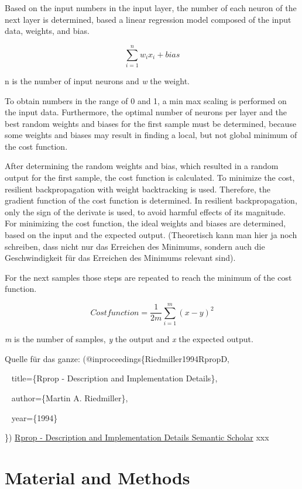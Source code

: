 \documentclass[
  parskip,
  oneside]{scrreprt}
\begin{document}
Based on the input numbers in the input layer, the number of each neuron
of the next layer is determined, based a linear regression model
composed of the input data, weights, and bias.

\[
\sum_{i=1} ^{n} w_i x_i + bias
\]

n is the number of input neurons and \emph{w} the weight.

To obtain numbers in the range of 0 and 1, a min max scaling is
performed on the input data. Furthermore, the optimal number of neurons
per layer and the best random weights and biases for the first sample
must be determined, because some weights and biases may result in
finding a local, but not global minimum of the cost function.

After determining the random weights and bias, which resulted in a
random output for the first sample, the cost function is calculated. To
minimize the cost, resilient backpropagation with weight backtracking is
used. Therefore, the gradient function of the cost function is
determined. In resilient backpropagation, only the sign of the derivate
is used, to avoid harmful effects of its magnitude. For minimizing the
cost function, the ideal weights and biases are determined, based on the
input and the expected output. (Theoretisch kann man hier ja noch
schreiben, dass nicht nur das Erreichen des Minimums, sondern auch die
Geschwindigkeit für das Erreichen des Minimums relevant sind).

For the next samples those steps are repeated to reach the minimum of
the cost function.

\[
Cost function = \frac {1}{2m} \sum_{i=1} ^{m} (x - y)^2
\]

\emph{m} is the number of samples, \emph{y} the output and \emph{x} the
expected output.

Quelle für das ganze: (@inproceedings\{Riedmiller1994RpropD,

~ title=\{Rprop - Description and Implementation Details\},

~ author=\{Martin A. Riedmiller\},

~ year=\{1994\}

\})
\href{https://www.semanticscholar.org/paper/Rprop-Description-and-Implementation-Details-Riedmiller/a8815421205d3a8938d78db974db1d4f3584ffb6}{Rprop
- Description and Implementation Details \textbar{} Semantic Scholar}
xxx

\hypertarget{material-and-methods}{%
\chapter{Material and Methods}\label{material-and-methods}}
\end{document}
